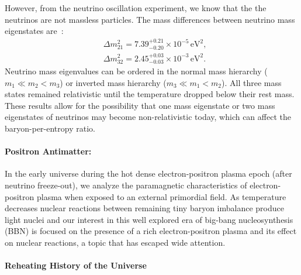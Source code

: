 However, from the neutrino oscillation experiment, we know that the the neutrinos are not massless particles. 
The mass differences between neutrino mass eigenstates are~\cite{ParticleDataGroup:2022pth}:
\begin{align}
&\Delta{m}_{21}^2=7.39^{+0.21}_{-0.20}\times10^{-5}\,\mathrm{eV}^2,\\
&\Delta{m}_{32}^2=2.45^{+0.03}_{-0.03}\times10^{-3}\,\mathrm{eV}^2.
\end{align}
Neutrino mass eigenvalues can be ordered in the normal mass hierarchy ($m_1\ll m_2<m_3$) or inverted mass hierarchy ($m_3\ll m_1<m_2$). All three mass states remained relativistic until the temperature dropped below their rest mass. These results allow for the possibility that one mass eigenstate or two mass eigenstates of neutrinos may become non-relativistic today, which can affect the baryon-per-entropy ratio.


\paragraph{Positron Antimatter:}
In the early universe during the hot dense electron-positron plasma epoch (after neutrino freeze-out), we analyze the paramagnetic characteristics of electron-positron plasma when exposed to an external primordial field. As temperature decreases nuclear reactions between remaining tiny baryon imbalance produce light nuclei and our interest in this well explored era of big-bang nucleosynthesis (BBN) is focused on the presence of a rich electron-positron plasma and its effect on nuclear reactions, a topic that has escaped wide attention.

\paragraph{Reheating History of the Universe}

